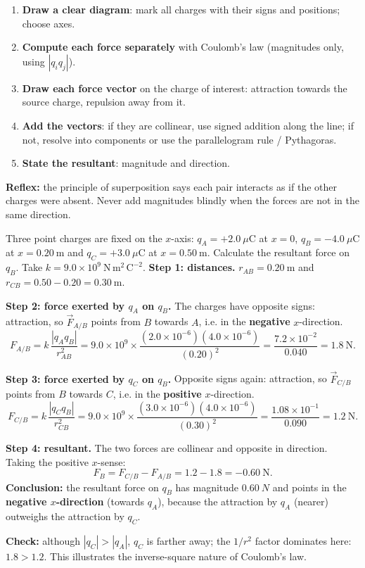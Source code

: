 \documentclass[11pt]{article}
\newcommand{\cle}[1]{{\popxbold\color{popdark}#1}}
\begin{document}
\begin{methode}
\begin{enumerate}
\item \textbf{Draw a clear diagram}: mark all charges with their signs and positions; choose axes.
\item \textbf{Compute each force separately} with Coulomb's law (magnitudes only, using $|q_i q_j|$).
\item \textbf{Draw each force vector} on the charge of interest: attraction towards the source charge, repulsion away from it.
\item \textbf{Add the vectors}: if they are collinear, use signed addition along the line; if not, resolve into components or use the parallelogram rule / Pythagoras.
\item \textbf{State the resultant}: magnitude and direction.
\end{enumerate}
\textbf{Reflex:} the \cle{principle of superposition} says each pair interacts as if the other charges were absent. Never add magnitudes blindly when the forces are not in the same direction.
\end{methode}

\begin{exoresolu}
Three point charges are fixed on the $x$-axis: $q_A = +2.0\ \mu\mathrm{C}$ at $x = 0$, $q_B = -4.0\ \mu\mathrm{C}$ at $x = 0.20\ \mathrm{m}$ and $q_C = +3.0\ \mu\mathrm{C}$ at $x = 0.50\ \mathrm{m}$. Calculate the resultant force on $q_B$. Take $k = 9.0\times 10^{9}\ \mathrm{N\,m^2\,C^{-2}}$.
\tcblower
\textbf{Step 1: distances.} $r_{AB} = 0.20\ \mathrm{m}$ and $r_{CB} = 0.50 - 0.20 = 0.30\ \mathrm{m}$.

\textbf{Step 2: force exerted by $q_A$ on $q_B$.} The charges have opposite signs: attraction, so $\vec F_{A/B}$ points from $B$ towards $A$, i.e. in the \textbf{negative} $x$-direction.
\[ F_{A/B} = k\,\frac{|q_A q_B|}{r_{AB}^2} = 9.0\times 10^{9}\times\frac{(2.0\times 10^{-6})(4.0\times 10^{-6})}{(0.20)^2} = \frac{7.2\times 10^{-2}}{0.040} = 1.8\ \mathrm{N}. \]

\textbf{Step 3: force exerted by $q_C$ on $q_B$.} Opposite signs again: attraction, so $\vec F_{C/B}$ points from $B$ towards $C$, i.e. in the \textbf{positive} $x$-direction.
\[ F_{C/B} = k\,\frac{|q_C q_B|}{r_{CB}^2} = 9.0\times 10^{9}\times\frac{(3.0\times 10^{-6})(4.0\times 10^{-6})}{(0.30)^2} = \frac{1.08\times 10^{-1}}{0.090} = 1.2\ \mathrm{N}. \]

\textbf{Step 4: resultant.} The two forces are collinear and opposite in direction. Taking the positive $x$-sense:
\[ F_B = F_{C/B} - F_{A/B} = 1.2 - 1.8 = -0.60\ \mathrm{N}. \]
\textbf{Conclusion:} the resultant force on $q_B$ has magnitude $\SI{0.60}{N}$ and points in the \textbf{negative $x$-direction} (towards $q_A$), because the attraction by $q_A$ (nearer) outweighs the attraction by $q_C$.

\textbf{Check:} although $|q_C| > |q_A|$, $q_C$ is farther away; the $1/r^2$ factor dominates here: $1.8 > 1.2$. This illustrates the inverse-square nature of Coulomb's law.
\end{exoresolu}
\end{document}
